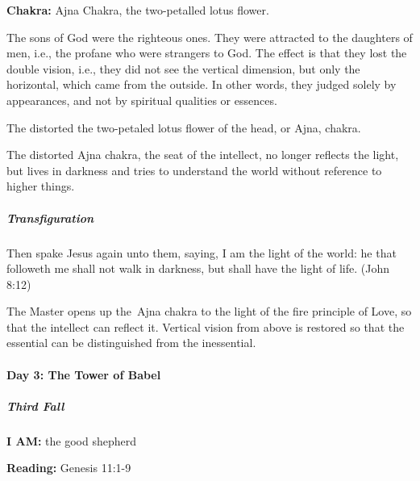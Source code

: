 \textbf{Chakra:} Ajna Chakra, the two-petalled lotus flower.


The sons of God were the righteous ones. They were attracted to the daughters of men, i.e., the profane who were strangers to God. The effect is that they lost the double vision, i.e., they did not see the vertical dimension, but only the horizontal, which came from the outside. In other words, they judged solely by appearances, and not by spiritual qualities or essences.

The distorted the two-petaled lotus flower of the head, or Ajna, chakra.

The distorted Ajna chakra, the seat of the intellect, no longer reflects the light, but lives in darkness and tries to understand the world without reference to higher things.


\subparagraph{Transfiguration}

\begin{quotex}
Then spake Jesus again unto them, saying, I am the light of the world: he that followeth me shall not walk in darkness, but shall have the light of life. (John 8:12) 

\end{quotex}
The Master opens up the Ajna chakra to the light of the fire principle of Love, so that the intellect can reflect it. Vertical vision from above is restored so that the essential can be distinguished from the inessential.


\paragraph{Day 3: The Tower of Babel}

\subparagraph{Third Fall}

\textbf{I AM:} the good shepherd

\textbf{Reading:} Genesis 11:1-9


